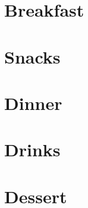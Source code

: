 \documentclass{book}
\begin{document}
\tableofcontents

\chapter{Breakfast}



\chapter{Snacks}



\chapter{Dinner}









\chapter{Drinks}


\chapter{Dessert}






\end{document}
